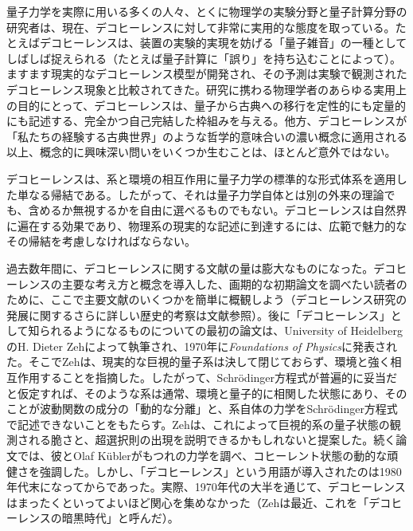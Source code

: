 \hypertarget{srcpage:10}{}\label{srcpage:10}量子力学を実際に用いる多くの人々、とくに物理学の実験分野と量子計算分野の研究者は、現在、デコヒーレンスに対して非常に実用的な態度を取っている。たとえばデコヒーレンスは、装置の実験的実現を妨げる「量子雑音」の一種としてしばしば捉えられる（たとえば量子計算に「誤り」を持ち込むことによって）。ますます現実的なデコヒーレンス模型が開発され、その予測は実験で観測されたデコヒーレンス現象と比較されてきた。研究に携わる物理学者のあらゆる実用上の目的にとって、デコヒーレンスは、量子から古典への移行を定性的にも定量的にも記述する、完全かつ自己完結した枠組みを与える。他方、デコヒーレンスが「私たちの経験する古典世界」のような哲学的意味合いの濃い概念に適用される以上、概念的に興味深い問いをいくつか生むことは、ほとんど意外ではない。

デコヒーレンスは、系と環境の相互作用に量子力学の標準的な形式体系を適用した単なる帰結である。したがって、それは量子力学自体とは別の外来の理論でも、含めるか無視するかを自由に選べるものでもない。デコヒーレンスは自然界に遍在する効果であり、物理系の現実的な記述に到達するには、広範で魅力的なその帰結を考慮しなければならない。

過去数年間に、デコヒーレンスに関する文献の量は膨大なものになった。デコヒーレンスの主要な考え方と概念を導入した、画期的な初期論文を調べたい読者のために、ここで主要文献のいくつかを簡単に概観しよう（デコヒーレンス研究の発展に関するさらに詳しい歴史的考察は文献\cite{ref011}参照）。後に「デコヒーレンス」として知られるようになるものについての最初の論文は、University of HeidelbergのH. Dieter Zehによって執筆され、1970年に\textit{Foundations of Physics}に発表された\cite{ref004}。そこでZehは、現実的な巨視的量子系は決して閉じておらず、環境と強く相互作用することを指摘した。したがって、Schrödinger方程式が普遍的に妥当だと仮定すれば、そのような系は通常、環境と量子的に相関した状態にあり、そのことが波動関数の成分の「動的な分離」と、系自体の力学をSchrödinger方程式で記述できないことをもたらす。Zehは、これによって巨視的系の量子状態の観測される脆さと、超選択則の出現を説明できるかもしれないと提案した。続く論文\cite{ref006}では、彼とOlaf Küblerがもつれの力学を調べ、コヒーレント状態の動的な頑健さを強調した。しかし、「デコヒーレンス」という用語が導入されたのは1980年代末になってからであった。実際、1970年代の大半を通じて、デコヒーレンスはまったくといってよいほど関心を集めなかった（Zehは最近、これを「デコヒーレンスの暗黒時代」と呼んだ\cite{ref011}）。


